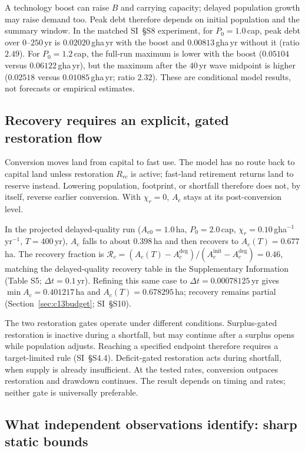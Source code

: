 \documentclass[preprint,12pt,authoryear]{elsarticle}
\begin{document}
A technology boost can raise $B$ and carrying capacity; delayed population growth may raise demand too. Peak debt therefore depends on initial population and the summary window. In the matched SI~\S S8 experiment, for $P_0=1.0$\,cap, peak debt over $0$--$250$\,yr is $0.02020$\,gha\,yr with the boost and $0.00813$\,gha\,yr without it (ratio $2.49$). For $P_0=1.2$\,cap, the full-run maximum is lower with the boost ($0.05104$ versus $0.06122$\,gha\,yr), but the maximum after the $40$\,yr wave midpoint is higher ($0.02518$ versus $0.01085$\,gha\,yr; ratio $2.32$). These are conditional model results, not forecasts or empirical estimates.

\subsection{Recovery requires an explicit, gated restoration flow}\label{sec:recovery}

Conversion moves land from capital to fast use. The model has no route back to capital land unless restoration $R_{rc}$ is active; fast-land retirement returns land to reserve instead. Lowering population, footprint, or shortfall therefore does not, by itself, reverse earlier conversion. With $\chi_r=0$, $A_c$ stays at its post-conversion level.

In the projected delayed-quality run ($A_{c0}=1.0$\,ha, $P_0=2.0$\,cap, $\chi_r=0.10$\,gha$^{-1}$\,yr$^{-1}$, $T=400$\,yr), $A_c$ falls to about $0.398$\,ha and then recovers to $A_c(T)=0.677$\,ha. The recovery fraction is $\mathcal R_c=(A_c(T)-A_c^{\mathrm{deg}})/(A_c^{\mathrm{init}}-A_c^{\mathrm{deg}})=0.46$, matching the delayed-quality recovery table in the Supplementary Information (Table S5; $\Delta t=0.1$\,yr). Refining this same case to $\Delta t=0.00078125$\,yr gives $\min A_c=0.401217$\,ha and $A_c(T)=0.678295$\,ha; recovery remains partial (Section~\ref{sec:c13budget}; SI~\S S10).

The two restoration gates operate under different conditions. Surplus-gated restoration is inactive during a shortfall, but may continue after a surplus opens while population adjusts. Reaching a specified endpoint therefore requires a target-limited rule (SI~\S S4.4). Deficit-gated restoration acts during shortfall, when supply is already insufficient. At the tested rates, conversion outpaces restoration and drawdown continues. The result depends on timing and rates; neither gate is universally preferable.

\subsection{What independent observations identify: sharp static bounds}\label{sec:c13ident}
\end{document}
